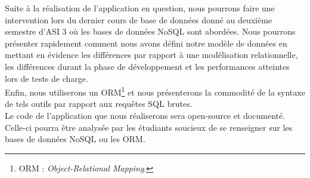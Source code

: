\documentclass[a4paper, 12pt, french]{article}
\begin{document}
		Suite à la réalisation de l'application en question, nous pourrons faire une intervention lors du dernier cours de base de données donné au deuxième semestre d'ASI 3 où les bases de données NoSQL sont abordées. Nous pourrons présenter rapidement comment nous avons défini notre modèle de données en mettant en évidence les différences par rapport à une modélisation relationnelle, les différences durant la phase de développement et les performances atteintes lors de tests de charge.\\

		Enfin, nous utiliserons un ORM\footnote{ORM : \textit{Object-Relational Mapping}.} et nous présenterons la commodité de la syntaxe de tels outils par rapport aux requêtes SQL brutes.\\

		Le code de l'application que nous réaliserons sera open-source et documenté. Celle-ci pourra être analysée par les étudiants soucieux de se renseigner sur les bases de données NoSQL ou les ORM.
\end{document}
